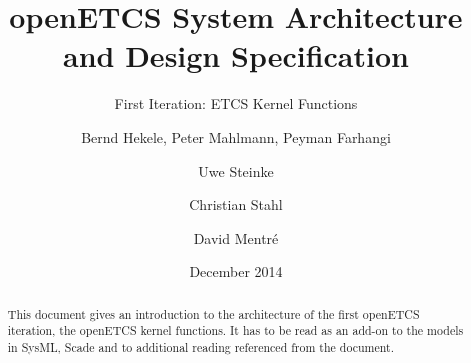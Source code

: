 \documentclass{template/openetcs_report}
\begin{document}
\frontmatter
{}

\newcommand{\define}[1]{\index{#1}\emph{#1}}


%




\title{openETCS System Architecture and Design Specification}

\subtitle{First Iteration: ETCS Kernel Functions}

\date{December 2014}








\author{Bernd Hekele, Peter Mahlmann, Peyman Farhangi}


\author{Uwe Steinke}


\author{Christian Stahl}


\author{David Mentré}




\begin{abstract}
This document gives an introduction to the architecture of the first openETCS iteration, the openETCS kernel functions. It has to be read as an add-on to the models in SysML, Scade and to additional reading referenced from the document.
\end{abstract}
\end{document}
